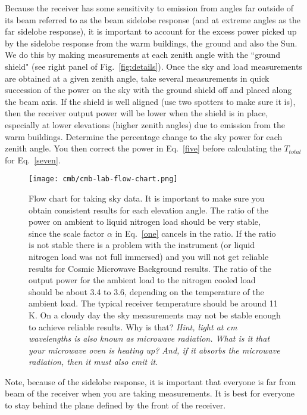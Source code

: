 Because the receiver has some sensitivity to emission from angles far outside of its beam referred to as the beam sidelobe response (and at extreme angles as the far sidelobe response),  it is important to account for the excess power picked up by the sidelobe response from the warm buildings, the ground and also the Sun. We do this by making measurements at each zenith angle with the   ``ground shield" (see right panel of Fig.~\ref{fig:details}).  Once the sky and load measurements are obtained at a given zenith angle, take several measurements in quick succession of the power on the sky with the ground shield off and placed along the beam axis.  If the shield is well aligned (use two spotters to make sure it is), then the receiver output power will be lower when the shield is in place, especially at lower elevations (higher zenith angles) due to emission from the warm buildings.  Determine the percentage change to the sky power for each zenith angle. You then correct the power in Eq.~\ref{five} before calculating the $T_{total}$ for Eq.~\ref{seven}.

\begin{figure}
	\begin{center}
		\texttt{[image: cmb/cmb-lab-flow-chart.png]}
		\caption{Flow chart for taking sky data. It is important to make sure you obtain consistent results for each elevation angle. The ratio of the power on ambient to liquid nitrogen load should be very stable, since the scale factor $\alpha$ in Eq.~\ref{one} cancels in the ratio.  If the ratio is not stable there is a problem with the instrument (or liquid nitrogen load was not full immersed) and you will not get reliable results for Cosmic Microwave Background results.  The ratio of the output power for the ambient load to the nitrogen cooled load should be about 3.4 to 3.6, depending on the temperature of the ambient load. The typical receiver temperature should be around 11 K.  On a cloudy day the sky measurements may not be stable enough to achieve reliable results.  Why is that? \textit{Hint, light at cm wavelengths is also known as microwave radiation.  What is it that your microwave oven is heating up? And, if it absorbs the microwave radiation, then it must also emit it.}}
		\label{fig:flow-chart}
	\end{center}
\end{figure}

Note, because of the sidelobe response, it is important that everyone is far from beam of the receiver when you are taking measurements. It is best for everyone to stay behind the plane defined by the front of the receiver. 

